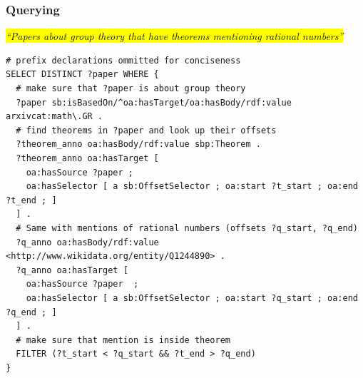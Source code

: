 \documentclass[aspectratio=169]{beamer}
\begin{document}
\begin{frame}[fragile]
    \frametitle{Querying}
    {\centering\itshape
        \colorbox{yellow}{
    ``Papers about group theory that have theorems mentioning rational numbers''
}
    \par}
    \footnotesize
\begin{lstlisting}[language=SPARQL]
# prefix declarations ommitted for conciseness
SELECT DISTINCT ?paper WHERE {
  # make sure that ?paper is about group theory
  ?paper sb:isBasedOn/^oa:hasTarget/oa:hasBody/rdf:value arxivcat:math\.GR .
  # find theorems in ?paper and look up their offsets
  ?theorem_anno oa:hasBody/rdf:value sbp:Theorem .
  ?theorem_anno oa:hasTarget [
    oa:hasSource ?paper ;
    oa:hasSelector [ a sb:OffsetSelector ; oa:start ?t_start ; oa:end ?t_end ; ]
  ] .
  # Same with mentions of rational numbers (offsets ?q_start, ?q_end)
  ?q_anno oa:hasBody/rdf:value <http://www.wikidata.org/entity/Q1244890> .
  ?q_anno oa:hasTarget [
    oa:hasSource ?paper  ;
    oa:hasSelector [ a sb:OffsetSelector ; oa:start ?q_start ; oa:end ?q_end ; ]
  ] .
  # make sure that mention is inside theorem
  FILTER (?t_start < ?q_start && ?t_end > ?q_end)
}
\end{lstlisting}

\end{frame}
\end{document}

